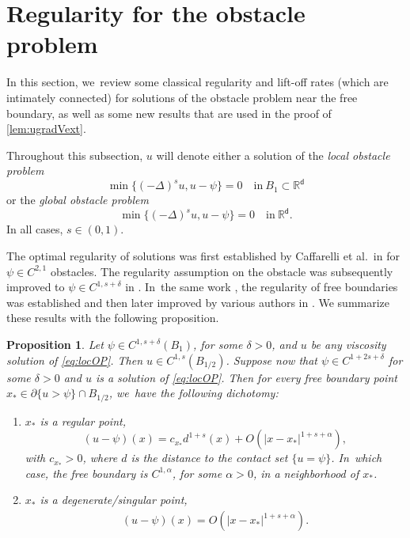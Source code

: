 \documentclass[10pt]{amsart}
\newenvironment{enumeratei}
{\bgroup\def\theenumi{\roman{enumi}}\def\theenumii{\arabic{enumii}}\begin{enumerate}}
{\end{enumerate}\egroup}
\theoremstyle{plain}
\newtheorem{prop}[thm]{Proposition}
\theoremstyle{definition}
\newcommand{\R}{{\mathbb{R}}}
\let\al\alpha
\let\p\partial
\renewcommand{\d}{\mathsf{d}}
\begin{document}
\section{Regularity for the obstacle problem}\label{sec:appOP}
In this section, we~review some classical regularity {and lift-off rates (which are intimately connected)} for solutions of the obstacle problem near the free boundary, as well as some new results that are used in the proof of \cref{lem:ugradVext}.

Throughout this subsection, $u$ will denote either a solution of the \emph{local obstacle problem}
\begin{equation}\label{eq:locOP}
\min\{(-\Delta)^s u, u-\psi\} = 0 \quad \text{in} \ B_1\subset\R^\d
\end{equation}
or the \emph{global obstacle problem}
\begin{equation}\label{eq:globOP}
\min\{(-\Delta)^s u, u-\psi\} = 0 \quad \text{in} \ \R^\d.
\end{equation}
In all cases, $s\in (0,1)$.

The optimal regularity of solutions was first established by Caffarelli et al.\ in \cite{CSS2008} for $\psi\in C^{2,1}$ obstacles. The regularity assumption on the obstacle was subsequently improved to $\psi\in C^{1,s+\delta}$ in \cite{CdSS2017}. In~the same work \cite{CSS2008}, the regularity of free boundaries was established and then later improved by various authors in \cite{CdSS2017,rOS2017}. We summarize these results with the following proposition.

\begin{prop}\label{prop:OPreg}
Let $\psi \in C^{1,s+\delta}(B_1)$, for some $\delta>0$, and $u$ be any viscosity solution of \eqref{eq:locOP}. Then $u\in C^{1,s}(B_{1/2})$.
Suppose now that $\psi \in C^{1+2s+\delta}$ for some $\delta>0$ and $u$ is a solution of \eqref{eq:locOP}. Then for every free boundary point $x_*\in \p\{u>\psi\} \cap B_{1/2}$, we~have the following dichotomy:
\begin{enumeratei}
\item\label{item:regpt} $x_*$ is a \emph{regular point},
\begin{equation}\label{eq:regptasy}
(u-\psi)(x) = c_{x_*}d^{1+s}(x) + O(|x-x_*|^{1+s+\al}),
\end{equation}
with $c_{x_*}>0$, where $d$ is the distance to the contact set $\{u=\psi\}$. In~which case, the free boundary is $C^{1,\al}${, for some $\al>0$,} in a neighborhood of $x_*$.
\item\label{item:singpt} $x_*$ is a \emph{degenerate/singular point},
\begin{align*}
(u-\psi)(x) = O(|x-x_*|^{1+s+\al}).
\end{align*}
\end{enumeratei}
\end{prop}
\end{document}
